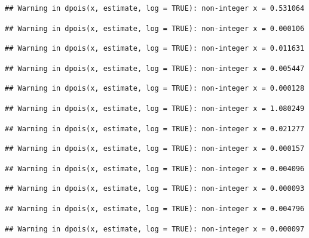\documentclass[]{article}
\begin{document}
\begin{verbatim}
## Warning in dpois(x, estimate, log = TRUE): non-integer x = 0.531064
\end{verbatim}

\begin{verbatim}
## Warning in dpois(x, estimate, log = TRUE): non-integer x = 0.000106
\end{verbatim}

\begin{verbatim}
## Warning in dpois(x, estimate, log = TRUE): non-integer x = 0.011631
\end{verbatim}

\begin{verbatim}
## Warning in dpois(x, estimate, log = TRUE): non-integer x = 0.005447
\end{verbatim}

\begin{verbatim}
## Warning in dpois(x, estimate, log = TRUE): non-integer x = 0.000128
\end{verbatim}

\begin{verbatim}
## Warning in dpois(x, estimate, log = TRUE): non-integer x = 1.080249
\end{verbatim}

\begin{verbatim}
## Warning in dpois(x, estimate, log = TRUE): non-integer x = 0.021277
\end{verbatim}

\begin{verbatim}
## Warning in dpois(x, estimate, log = TRUE): non-integer x = 0.000157
\end{verbatim}

\begin{verbatim}
## Warning in dpois(x, estimate, log = TRUE): non-integer x = 0.004096
\end{verbatim}

\begin{verbatim}
## Warning in dpois(x, estimate, log = TRUE): non-integer x = 0.000093
\end{verbatim}

\begin{verbatim}
## Warning in dpois(x, estimate, log = TRUE): non-integer x = 0.004796
\end{verbatim}

\begin{verbatim}
## Warning in dpois(x, estimate, log = TRUE): non-integer x = 0.000097
\end{verbatim}
\end{document}
